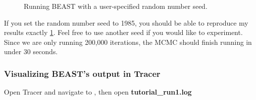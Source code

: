 \documentclass[11pt]{article}
\begin{document}
\begin{figure}[!h]
\centering
{}
\caption{\small Running BEAST with a user-specified random number seed.}
\label{fig:beast_run1}
\end{figure}

If you set the random number seed to 1985, you should be able to reproduce my results exactly \ref{fig:beast_run1}. Feel free to use another seed if you would like to experiment. Since we are only running 200,000 iterations, the MCMC should finish running in under $30$ seconds.

\bigskip
\subsubsection{Visualizing BEAST's output in Tracer}

\begin{framed}
Open Tracer and navigate to , then open \textbf{tutorial\_run1.log}
\end{framed}
\end{document}

